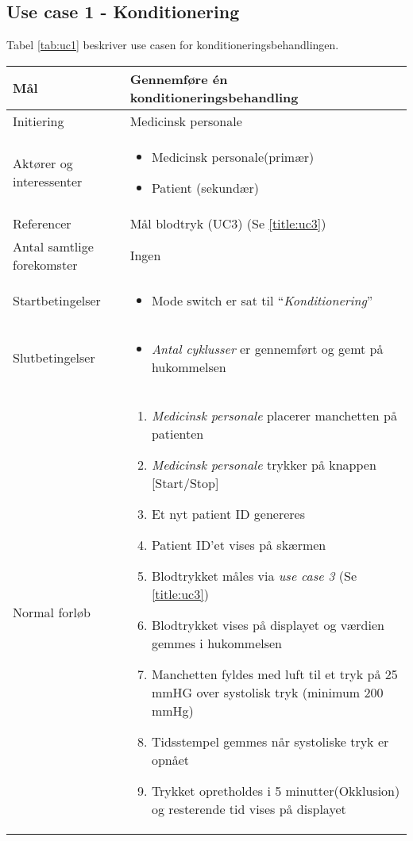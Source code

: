 \subsection{Use case 1 - Konditionering} \label{title:uc1}
Tabel \ref{tab:uc1} beskriver use casen for konditioneringsbehandlingen. 
\begin{center}
		\begin{longtable}{ | p{} | p{}| } 
			\hline
			Mål & Gennemføre én konditioneringsbehandling  \\ 
			\hline
			Initiering &  Medicinsk personale\\
			\hline
			Aktører og interessenter & 
			\begin{itemize}
				\item Medicinsk personale(primær)
				\item Patient (sekundær)
			\end{itemize} \\ 
			\hline
			Referencer & Mål blodtryk (UC3) (Se \ref{title:uc3}) \\ 
			\hline
			Antal samtlige forekomster & Ingen\\ 
			\hline	
			Startbetingelser & 
			\begin{itemize}
				\setlength\itemsep{0cm} %
				\item Mode switch er sat til “\textit{Konditionering}”
			\end{itemize} \\ 
			\hline
			Slutbetingelser & 
			\begin{itemize}
				\setlength\itemsep{0cm} %
				\item \textit{Antal cyklusser} er gennemført og gemt på hukommelsen
			\end{itemize} \\ 
			\hline
			Normal forløb & \begin{enumerate}
				\setlength\itemsep{0cm} %
				\item \textit{Medicinsk personale} placerer manchetten på patienten
				\item \textit{Medicinsk personale} trykker på knappen [Start/Stop]
				\subitem[Undtagelse \#1]
				\item Et nyt patient ID genereres
				\subitem[Undtagelse \#2] 
				\item Patient ID’et vises på skærmen
				\item Blodtrykket måles via \textit{use case 3} (Se \ref{title:uc3})
				\item Blodtrykket vises på displayet og værdien gemmes i hukommelsen
				\item Manchetten fyldes med luft til et tryk på 25 mmHG over systolisk tryk (minimum 200 mmHg)				
				\item Tidsstempel gemmes når systoliske tryk er opnået
				\item Trykket opretholdes i 5 minutter(Okklusion) og resterende tid vises på displayet
				

\end{enumerate}
\end{longtable}
\end{center}
